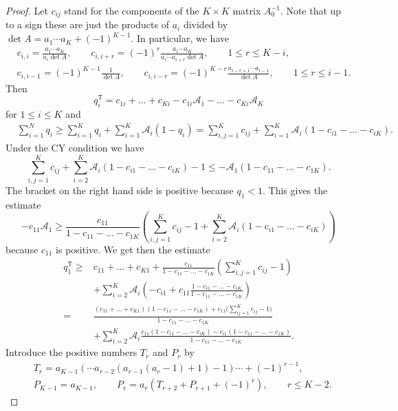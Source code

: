 \documentclass[10pt,a4paper]{amsart}
\numberwithin{equation}{section}
\def\A{{\mathcal A}}
\begin{document}
\begin{proof}
 Let $c_{ij}$ stand for the components of the $K \times K$ matrix $A_0^{-1}$. Note that up to a sign these are just the products of $a_i$ divided by $\det A = a_1\cdots a_K + (-1)^{K-1}$.
 In particular, we have
 \begin{align*}
 &c_{i,i} = \frac{a_1 \cdots a_K}{a_i \det A}, \qquad c_{i,i+r} = (-1)^r \frac{a_1 \cdots a_K}{a_i \cdots a_{i+r} \det A}, \qquad 1 \le r \le K-i,
 \\
 &c_{i,i-1} = (-1)^{K-1}\frac{1}{\det A}, \qquad c_{i,i-r} = (-1)^{K-r}\frac{a_{i-r+1}\cdots a_{i-1}}{\det A}, \qquad 1 \le r \le i-1.
 \end{align*}
 Then
 \[
 q_i^{\mathsf{T}} = c_{1i} + \dots + c_{Ki} - c_{1i} \A_1 - \dots - c_{Ki} \A_K
 \]
 for $1 \le i \le K$ and
 \begin{align*}
 & \sum_{i=1}^N q_i \ge \sum_{i=1}^K q_i + \sum_{i=1}^K \A_i (1 - q_i)
 = \sum_{i,j=1}^K c_{ij} + \sum_{i=1}^K \A_i (1 - c_{i1} - \dots - c_{iK}).
 \end{align*}
 Under the CY condition we have
 \[
 \sum_{i,j=1}^K c_{ij} + \sum_{i=2}^K \A_i (1 - c_{i1} - \dots - c_{iK}) - 1 \le - \A_1 (1 - c_{11} - \dots - c_{1K}).
 \]
 The bracket on the right hand side is positive because $q_1 < 1$. This gives the estimate
 \[
 - c_{11}\A_1 \ge
 \frac{c_{11}}{1 - c_{11} - \dots - c_{1K}} \left( \sum_{i,j=1}^K c_{ij} -1 + \sum_{i=2}^K \A_i (1 - c_{i1} - \dots - c_{iK}) \right)
 \]
 because $c_{11}$ is positive. We get then the estimate
 \begin{align*}
 q_1^{\mathsf{T}} \ge{}& c_{11} + \dots + c_{K1} + \frac{c_{11}}{1 - c_{11} - \dots - c_{1K}} \left( \sum_{i,j=1}^K c_{ij} - 1 \right)
 \\
 & + \sum_{i=2}^K \A_i \left( - c_{i1} + c_{11} \frac{1 - c_{i1} - \dots - c_{iK}}{1 - c_{11} - \dots - c_{1K}} \right)
 \\
 ={}& \frac{(c_{11}+\dots + c_{K1}) (1 - c_{11} - \dots - c_{1K}) + c_{11} \bigl( \sum_{ij=1}^K c_{ij} -1\bigr)}{1 - c_{11} - \dots - c_{1K}}
 \\
 & + \sum_{i=2}^K \A_i \frac{c_{11}(1 - c_{i1} - \dots - c_{iK}) - c_{i1} (1 - c_{11} - \dots - c_{1K})}{1 - c_{11} - \dots - c_{1K}}.
 \end{align*}
 Introduce the positive numbers $T_r$ and $P_r$ by
 \begin{align*}
 &T_r = a_{K-1}(\cdots a_{r-2}(a_{r-1}(a_r-1) + 1) -1) \cdots + (-1)^{r-1},
 \\
 &P_{K-1} = a_{K-1}, \qquad P_r = a_r (T_{r+2} + P_{r+1} + (-1)^{r}), \qquad r \le K-2.

\end{align*}
\end{proof}
\end{document}
